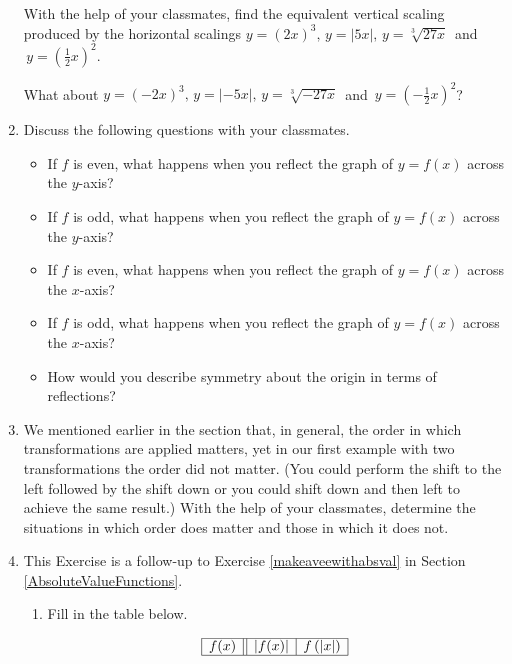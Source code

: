 \documentclass{ximera}
\begin{document}
\begin{enumerate}
With the help of your classmates, find the equivalent vertical scaling produced by the horizontal scalings $y = (2x)^{3}, \, y = |5x|, \, y = \sqrt[3]{27x} \, $ and $\, y = \left(\frac{1}{2} x\right)^{2}$.  

What about $y = (-2x)^{3}, \, y = |-5x|, \, y = \sqrt[3]{-27x}\, $ and $\, y = \left(-\frac{1}{2} x\right)^{2}$?

\newpage

\item   \label{SymmetryandReflectionsExercise}  Discuss the following questions with your classmates.

\begin{itemize}
\item If $f$ is even, what happens when you reflect the graph of $y = f(x)$ across the $y$-axis? 
\item If $f$ is odd, what happens when you reflect the graph of $y = f(x)$ across the $y$-axis? 
\item  If $f$ is even, what happens when you reflect the graph of $y = f(x)$ across the $x$-axis? 
\item  If $f$ is odd, what happens when you reflect the graph of $y = f(x)$ across the $x$-axis?  
\item How would you describe symmetry about the origin in terms of reflections?
\end{itemize}

\item  We mentioned earlier in the section that, in general, the order in which transformations are applied matters, yet in our first example with two transformations the order did not matter. (You could perform the shift to the left followed by the shift down or you could shift down and then left to achieve the same result.)  With the help of your classmates, determine the situations in which order does matter and those in which it does not.

\item \label{relatedbyabsexercise}  This Exercise is a follow-up to Exercise \ref{makeaveewithabsval} in Section \ref{AbsoluteValueFunctions}.

\begin{enumerate}

\item  Fill in the table below.

\[ \begin{array}{|c||c|c|}

\hline

f(x) & |f(x)| & f\left(|x| \right)  \\ \hline


\end{array}\]
\end{enumerate}
\end{enumerate}
\end{document}
